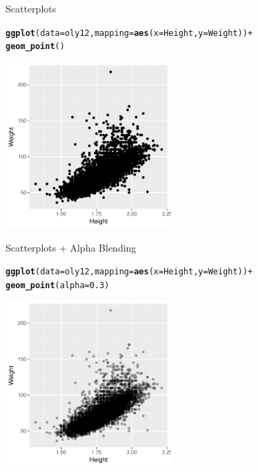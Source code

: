 \documentclass[10pt]{beamer}\usepackage[]{graphicx}\usepackage[]{color}
\makeatletter
\newcommand{\hlnum}[1]{\textcolor[rgb]{0.686,0.059,0.569}{#1}}%
\newcommand{\hlopt}[1]{\textcolor[rgb]{0,0,0}{#1}}%
\newcommand{\hlstd}[1]{\textcolor[rgb]{0.345,0.345,0.345}{#1}}%
\newcommand{\hlkwc}[1]{\textcolor[rgb]{0.333,0.667,0.333}{#1}}%
\newcommand{\hlkwd}[1]{\textcolor[rgb]{0.737,0.353,0.396}{\textbf{#1}}}%
\newenvironment{kframe}{%
 \def\at@end@of@kframe{}%
 \ifinner\ifhmode%
  \def\at@end@of@kframe{\end{minipage}}%
  \begin{minipage}{\columnwidth}%
 \fi\fi%
 \def\FrameCommand##1{\hskip\@totalleftmargin \hskip-\fboxsep
 \colorbox{shadecolor}{##1}\hskip-\fboxsep
     \hskip-\linewidth \hskip-\@totalleftmargin \hskip\columnwidth}%
 \MakeFramed {\advance\hsize-\width
   \@totalleftmargin\z@ \linewidth\hsize
   \@setminipage}}%
 {\par\unskip\endMakeFramed%
 \at@end@of@kframe}
\newenvironment{knitrout}{}{} %
\makeatother
\begin{document}
\begin{frame}[fragile]{Scatterplots}
\begin{knitrout}\small
{}\color{fgcolor}\begin{kframe}
\begin{alltt}
\hlkwd{ggplot}\hlstd{(}\hlkwc{data} \hlstd{= oly12,} \hlkwc{mapping} \hlstd{=} \hlkwd{aes}\hlstd{(}\hlkwc{x} \hlstd{= Height,} \hlkwc{y} \hlstd{= Weight))} \hlopt{+}
 \hlkwd{geom_point}\hlstd{()}
\end{alltt}
\end{kframe}
\includegraphics[width=2.5in,height=2.5in]{figure/unnamed-chunk-5-1} 

\end{knitrout}
\end{frame}

\begin{frame}[fragile]{Scatterplots + Alpha Blending}
\begin{knitrout}\small
{}\color{fgcolor}\begin{kframe}
\begin{alltt}
\hlkwd{ggplot}\hlstd{(}\hlkwc{data} \hlstd{= oly12,} \hlkwc{mapping} \hlstd{=} \hlkwd{aes}\hlstd{(}\hlkwc{x} \hlstd{= Height,} \hlkwc{y} \hlstd{= Weight))} \hlopt{+}
 \hlkwd{geom_point}\hlstd{(}\hlkwc{alpha} \hlstd{=} \hlnum{0.3}\hlstd{)}
\end{alltt}
\end{kframe}
\includegraphics[width=2.5in,height=2.5in]{figure/unnamed-chunk-6-1} 

\end{knitrout}
\end{frame}
\end{document}
